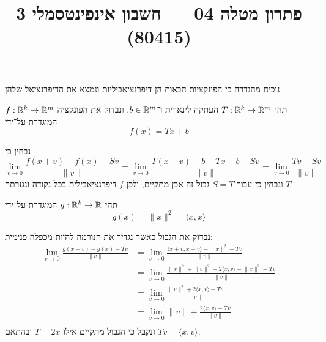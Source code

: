 
\title{פתרון מטלה 04 --- חשבון אינפינטסמלי 3 (80415)}


\maketitle
\maketitleprint{}

\Question{}
נוכיח מהגדרה כי הפונקציות הבאות הן דיפרנציאביליות ונמצא את הדיפרנציאל שלהן.

\Subquestion{}
תהי $T : \mathbb{R}^k \to \mathbb{R}^m$ העתקה לינארית ו־$b \in \mathbb{R}^m$, ונבדוק את הפונקציה $f : \mathbb{R}^k \to \mathbb{R}^m$ המוגדרת על־ידי
\[
	f(x) = Tx + b
\]

נבחין כי
\[
	\lim_{v \to 0} \frac{f(x + v) - f(x) - Sv}{\lVert v \rVert}
	= \lim_{v \to 0} \frac{T(x + v) + b - Tx - b - Sv}{\lVert v \rVert}
	= \lim_{v \to 0} \frac{Tv - Sv}{\lVert v \rVert}
\]
ונבחין כי עבור $S = T$ גבול זה אכן מתקיים, ולכן $f$ דיפרנציאבילית בכל נקודה ונגזרתה $T$.

\Subquestion{}
תהי $g : \mathbb{R}^k \to \mathbb{R}$ המוגדרת על־ידי
\[
	g(x) = \lVert x \rVert^2 = \langle x, x \rangle
\]

נבדוק את הגבול כאשר נגדיר את הנורמה להיות מכפלה פנימית:
\begin{align*}
	\lim_{v \to 0} \frac{g(x + v) - g(x) - Tv}{\lVert v \rVert}
	& = \lim_{v \to 0} \frac{\langle x + v, x + v \rangle - \lVert x \rVert^2 - Tv}{\lVert v \rVert} \\
	& = \lim_{v \to 0} \frac{\lVert x \rVert^2 + \lVert v \rVert^2 + 2\langle x, v \rangle - \lVert x \rVert^2 - Tv}{\lVert v \rVert} \\
	& = \lim_{v \to 0} \frac{\lVert v \rVert^2 + 2\langle x, v \rangle - Tv}{\lVert v \rVert} \\
	& = \lim_{v \to 0} \lVert v \rVert + \frac{2\langle x, v \rangle - Tv}{\lVert v \rVert} \\
\end{align*}
ונקבל כי הגבול מתקיים אילו $T = 2x$ ובהתאם $Tv = \langle x, v \rangle$.

